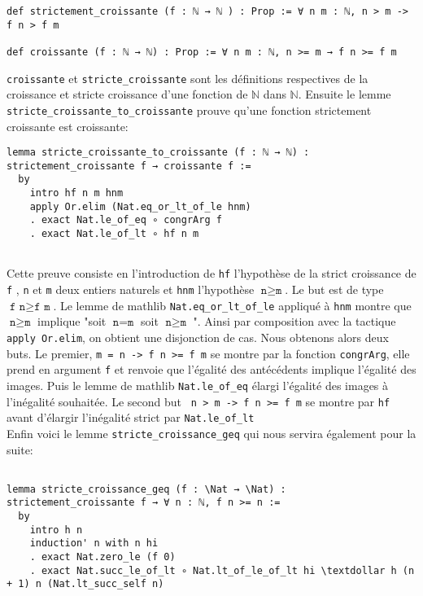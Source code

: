 \documentclass[a4paper, 12pt]{article}
\newcommand{\lean}[1]{\texttt{#1}}
\begin{document}
\begin{verbatim}
def strictement_croissante (f : ℕ → ℕ ) : Prop := ∀ n m : ℕ, n > m -> f n > f m

def croissante (f : ℕ → ℕ) : Prop := ∀ n m : ℕ, n >= m → f n >= f m

\end{verbatim}

\lean{croissante} et \lean{stricte_croissante} sont les définitions respectives de la croissance et stricte croissance d'une fonction de $\mathbb{N}$ dans $\mathbb{N}$. Ensuite le lemme \lean{stricte_croissante_to_croissante} prouve qu'une fonction strictement croissante est croissante:

\begin{verbatim}
lemma stricte_croissante_to_croissante (f : ℕ → ℕ) : strictement_croissante f → croissante f :=
  by
    intro hf n m hnm
    apply Or.elim (Nat.eq_or_lt_of_le hnm)
    . exact Nat.le_of_eq ∘ congrArg f
    . exact Nat.le_of_lt ∘ hf n m
    
\end{verbatim}



Cette preuve consiste en l'introduction de \lean{hf} l'hypothèse de la strict croissance de \lean{f} , \lean{n} et \lean{m} deux entiers naturels et \lean{hnm} l'hypothèse $ \lean{n} \geq \lean{m} $. Le but est de type $ \lean{f n} \geq \lean{f m} $. Le lemme de mathlib \lean{Nat.eq_or_lt_of_le} appliqué à \lean{hnm} montre que $ \lean{n} \geq \lean{m} $ implique "soit $ \lean{n} = \lean{m} $ soit $ \lean{n} \geq \lean{m} $ ". Ainsi par composition avec la tactique \lean{apply Or.elim}, on obtient une disjonction de cas. Nous obtenons alors deux buts. Le premier, \lean{m = n -> f n >=  f m}  se montre par la fonction \lean{congrArg}, elle prend en argument \lean{f} et renvoie que l'égalité des antécédents implique l'égalité des images. Puis le lemme de mathlib \lean{Nat.le_of_eq} élargi l'égalité des images à l'inégalité souhaitée. Le second but \lean{ n > m -> f n >= f m} se montre par \lean{hf} avant d'élargir l'inégalité strict par \lean{Nat.le_of_lt}\\



Enfin voici le lemme \lean{stricte_croissance_geq} qui nous servira également pour la suite:

\begin{verbatim}

lemma stricte_croissance_geq (f : \Nat → \Nat) : strictement_croissante f → ∀ n : ℕ, f n >= n :=
  by
    intro h n
    induction' n with n hi
    . exact Nat.zero_le (f 0)
    . exact Nat.succ_le_of_lt ∘ Nat.lt_of_le_of_lt hi \textdollar h (n + 1) n (Nat.lt_succ_self n)
\end{verbatim}   
    
\end{document}
